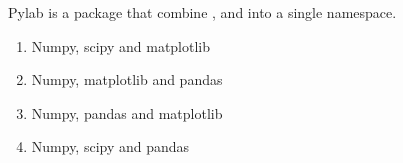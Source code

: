 \question
Pylab is a package that combine \underline{\hspace{2cm}}, \underline{\hspace{2cm}} and \underline{\hspace{2cm}} into a single namespace.

\begin{enumerate}
\item Numpy, scipy and matplotlib
\item Numpy, matplotlib and pandas
\item Numpy, pandas and matplotlib
\item Numpy, scipy and pandas
\end{enumerate}

